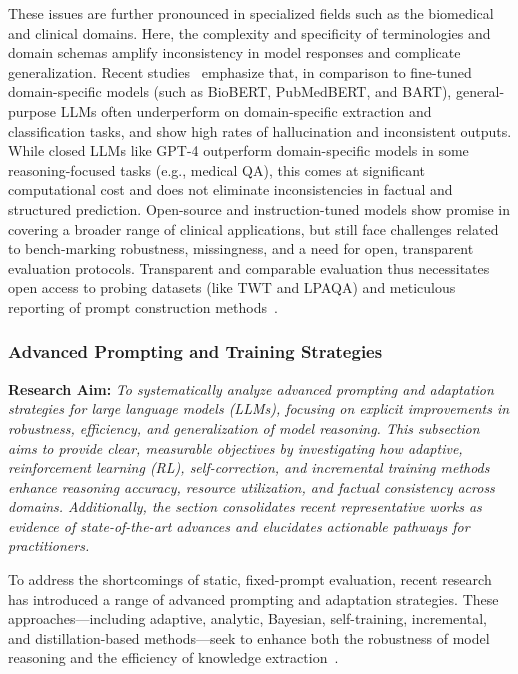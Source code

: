 \documentclass[sigconf]{acmart}
\begin{document}
These issues are further pronounced in specialized fields such as the biomedical and clinical domains. Here, the complexity and specificity of terminologies and domain schemas amplify inconsistency in model responses and complicate generalization. Recent studies~\cite{ref94,ref95} emphasize that, in comparison to fine-tuned domain-specific models (such as BioBERT, PubMedBERT, and BART), general-purpose LLMs often underperform on domain-specific extraction and classification tasks, and show high rates of hallucination and inconsistent outputs. While closed LLMs like GPT-4 outperform domain-specific models in some reasoning-focused tasks (e.g., medical QA), this comes at significant computational cost and does not eliminate inconsistencies in factual and structured prediction. Open-source and instruction-tuned models show promise in covering a broader range of clinical applications, but still face challenges related to bench-marking robustness, missingness, and a need for open, transparent evaluation protocols. Transparent and comparable evaluation thus necessitates open access to probing datasets (like TWT and LPAQA) and meticulous reporting of prompt construction methods~\cite{ref94,ref95,ref96,ref98}.

\subsubsection{Advanced Prompting and Training Strategies}

\textbf{Research Aim:} \textit{To systematically analyze advanced prompting and adaptation strategies for large language models (LLMs), focusing on explicit improvements in robustness, efficiency, and generalization of model reasoning. This subsection aims to provide clear, measurable objectives by investigating how adaptive, reinforcement learning (RL), self-correction, and incremental training methods enhance reasoning accuracy, resource utilization, and factual consistency across domains. Additionally, the section consolidates recent representative works as evidence of state-of-the-art advances and elucidates actionable pathways for practitioners.}

To address the shortcomings of static, fixed-prompt evaluation, recent research has introduced a range of advanced prompting and adaptation strategies. These approaches—including adaptive, analytic, Bayesian, self-training, incremental, and distillation-based methods—seek to enhance both the robustness of model reasoning and the efficiency of knowledge extraction~\cite{ref1,ref4,ref6,ref49,ref56,ref57,ref68,ref86,ref103}.
\end{document}
